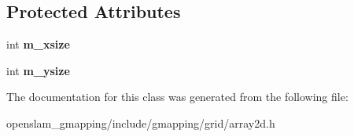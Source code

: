\subsection*{Protected Attributes}
\begin{DoxyCompactItemize}
\item 
\mbox{\label{classGMapping_1_1Array2D_aacab0ceb637229a97fe90e2d1a01ec53}} 
int {\bfseries m\+\_\+xsize}
\item 
\mbox{\label{classGMapping_1_1Array2D_afe60e4ad957faf1e8dc04d8850c38c04}} 
int {\bfseries m\+\_\+ysize}
\end{DoxyCompactItemize}


The documentation for this class was generated from the following file\+:\begin{DoxyCompactItemize}
\item 
openslam\+\_\+gmapping/include/gmapping/grid/array2d.\+h\end{DoxyCompactItemize}
